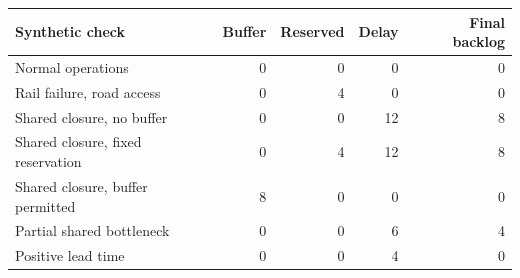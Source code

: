 \begin{tabularx}{\textwidth}{Yrrrr}
\toprule
Synthetic check & Buffer & Reserved & Delay & Final backlog \\
\midrule
Normal operations & 0 & 0 & 0 & 0 \\
Rail failure, road access & 0 & 4 & 0 & 0 \\
Shared closure, no buffer & 0 & 0 & 12 & 8 \\
Shared closure, fixed reservation & 0 & 4 & 12 & 8 \\
Shared closure, buffer permitted & 8 & 0 & 0 & 0 \\
Partial shared bottleneck & 0 & 0 & 6 & 4 \\
Positive lead time & 0 & 0 & 4 & 0 \\
\bottomrule
\end{tabularx}
